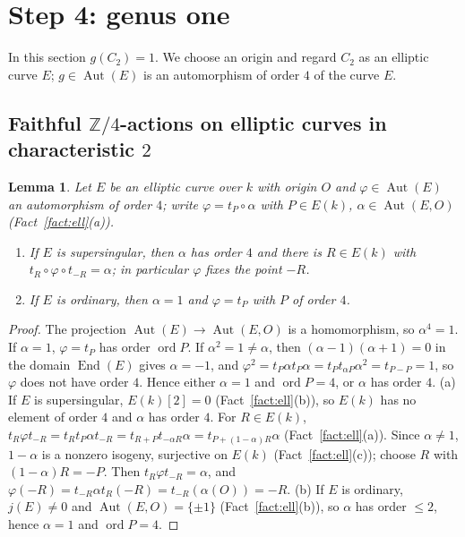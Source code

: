 \documentclass[11pt]{amsart}
\newtheorem{lemma}[theorem]{Lemma}
\theoremstyle{definition}
\theoremstyle{remark}
\newcommand{\Z}{\mathbb Z}
\newcommand{\Aut}{\operatorname{Aut}}
\newcommand{\End}{\operatorname{End}}
\begin{document}
\section{Step 4: genus one}\label{sec:step4}

In this section $g(C_2)=1$. We choose an origin and regard $C_2$ as an elliptic curve
$E$; $g\in\Aut(E)$ is an automorphism of order $4$ of the curve $E$.

\subsection{Faithful \texorpdfstring{$\Z/4$}{Z/4}-actions on elliptic curves in characteristic \texorpdfstring{$2$}{2}}

\begin{lemma}\label{lem:Z4}
Let $E$ be an elliptic curve over $k$ with origin $O$ and $\varphi\in\Aut(E)$ an
automorphism of order $4$; write $\varphi=t_P\circ\alpha$ with $P\in E(k)$,
$\alpha\in\Aut(E,O)$ (Fact~\ref{fact:ell}(a)).
\begin{enumerate}[label=\textup{(\alph*)}]
\item If $E$ is supersingular, then $\alpha$ has order $4$ and there is $R\in E(k)$ with
$t_R\circ\varphi\circ t_{-R}=\alpha$; in particular $\varphi$ fixes the point $-R$.
\item If $E$ is ordinary, then $\alpha=1$ and $\varphi=t_P$ with $P$ of order $4$.
\end{enumerate}
\end{lemma}

\begin{proof}
The projection $\Aut(E)\to\Aut(E,O)$ is a homomorphism, so $\alpha^4=1$. If $\alpha=1$,
$\varphi=t_P$ has order $\operatorname{ord}P$. If $\alpha^2=1\ne\alpha$, then
$(\alpha-1)(\alpha+1)=0$ in the domain $\End(E)$ gives $\alpha=-1$, and
$\varphi^2=t_P\alpha t_P\alpha=t_Pt_{\alpha P}\alpha^2=t_{P-P}=1$, so $\varphi$ does not
have order $4$. Hence either $\alpha=1$ and $\operatorname{ord}P=4$, or $\alpha$ has
order $4$.
(a) If $E$ is supersingular, $E(k)[2]=0$ (Fact~\ref{fact:ell}(b)), so $E(k)$ has no
element of order $4$ and $\alpha$ has order $4$. For $R\in E(k)$,
$t_R\varphi t_{-R}=t_Rt_P\alpha t_{-R}=t_{R+P}t_{-\alpha R}\alpha=t_{P+(1-\alpha)R}\alpha$
(Fact~\ref{fact:ell}(a)). Since $\alpha\ne1$, $1-\alpha$ is a nonzero isogeny, surjective
on $E(k)$ (Fact~\ref{fact:ell}(c)); choose $R$ with $(1-\alpha)R=-P$. Then
$t_R\varphi t_{-R}=\alpha$, and $\varphi(-R)=t_{-R}\alpha t_R(-R)=t_{-R}(\alpha(O))=-R$.
(b) If $E$ is ordinary, $j(E)\ne0$ and $\Aut(E,O)=\{\pm1\}$ (Fact~\ref{fact:ell}(b)), so
$\alpha$ has order $\le2$, hence $\alpha=1$ and $\operatorname{ord}P=4$.
\end{proof}
\end{document}
